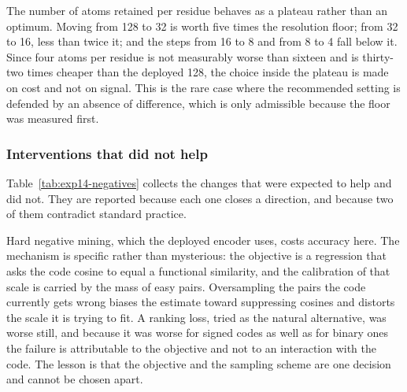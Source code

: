 \begin{table}[htbp]
  \centering
  \caption{Encoding mechanisms against a pooled control fitted on the same proteins
  with the same objective and budget. Held out on 2{,}646 proteins.
  $^{\dagger}$~below the resolution floor of Section~\ref{sec:exp14-floor}.}
  \label{tab:exp14-mechanism}
  
\end{table}

The number of atoms retained per residue behaves as a plateau rather than an optimum.
Moving from 128 to 32 is worth five times the resolution floor; from 32 to 16, less
than twice it; and the steps from 16 to 8 and from 8 to 4 fall below it. Since four
atoms per residue is not measurably worse than sixteen and is thirty-two times
cheaper than the deployed 128, the choice inside the plateau is made on cost and not
on signal. This is the rare case where the recommended setting is defended by an
absence of difference, which is only admissible because the floor was measured first.

\subsubsection{Interventions that did not help}

Table~\ref{tab:exp14-negatives} collects the changes that were expected to help and
did not. They are reported because each one closes a direction, and because two of
them contradict standard practice.

\begin{table}[htbp]
  \centering
  \caption{Interventions measured against the identical arm without them.
  $^{\dagger}$~below the resolution floor.}
  \label{tab:exp14-negatives}
  
\end{table}

Hard negative mining, which the deployed encoder uses, costs accuracy here. The
mechanism is specific rather than mysterious: the objective is a regression that asks
the code cosine to equal a functional similarity, and the calibration of that scale
is carried by the mass of easy pairs. Oversampling the pairs the code currently gets
wrong biases the estimate toward suppressing cosines and distorts the scale it is
trying to fit. A ranking loss, tried as the natural alternative, was worse still, and
because it was worse for signed codes as well as for binary ones the failure is
attributable to the objective and not to an interaction with the code. The lesson is
that the objective and the sampling scheme are one decision and cannot be chosen
apart.

